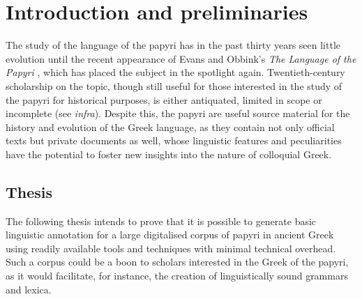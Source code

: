 \documentclass[10pt,a4paper,twoside,openright,titlepage,fleqn,%
               headinclude,,footinclude,BCOR5mm,%
               numbers=noenddot,cleardoublepage=empty,%
               tablecaptionabove]{scrbook}
\begin{document}
\pagestyle{plain}
\dominitoc

\frontmatter


\clearpage

\pagestyle{scrheadings}


\clearpage

\incrementmtc
\incrementmtc
\cleardoublepage

\mainmatter
{}

\chapter{Introduction and preliminaries}
\label{chp:introduction}

The study of the language of the papyri has in the past thirty years
seen little evolution until the recent appearance of Evans and Obbink's
\textit{The Language of the Papyri} \citep{lpapyri}, which has placed
the subject in the spotlight again. Twentieth-century scholarship on the
topic, though still useful for those interested in the study of the
papyri for historical purposes, is either antiquated, limited in scope
or incomplete (see \textit{infra}). Despite this, the papyri are
useful source material for the history and evolution of the Greek
language, as they contain not only official texts but private
documents as well, whose linguistic features and peculiarities have the
potential to foster new insights into the nature of colloquial Greek. 

\section{Thesis}
The following thesis intends to prove that it is possible to generate
basic linguistic annotation for a large digitalised corpus of papyri in
ancient Greek using readily available tools and techniques with minimal
technical overhead. Such a corpus could be  a boon to scholars interested
in the Greek of the papyri, as it would facilitate, for instance, the
creation of linguistically sound grammars and lexica.
\end{document}

